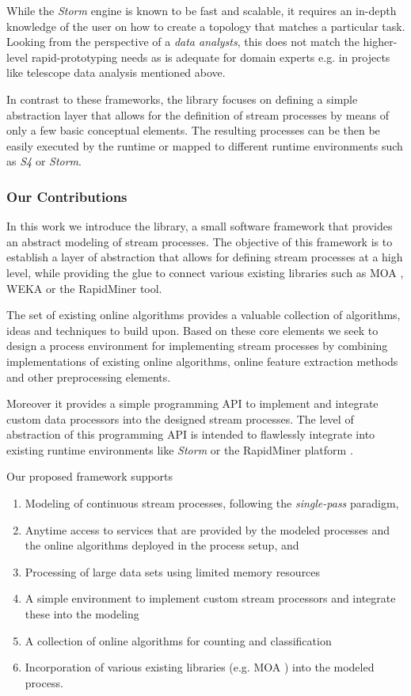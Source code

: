 While the {\em Storm} engine is known to be fast and scalable, it
requires an in-depth knowledge of the user on how to create a topology
that matches a particular task. Looking from the perspective of a {\em
  data analysts}, this does not match the higher-level
rapid-prototyping needs as is adequate for domain experts e.g. in
projects like telescope data analysis mentioned above.



In contrast to these frameworks, the \streams library focuses on
defining a simple abstraction layer that allows for the definition of
stream processes by means of only a few basic conceptual elements.
The resulting processes can be then be easily executed by the \streams
runtime or mapped to different runtime environments such as {\em S4}
or {\em Storm}.

\subsubsection*{Our Contributions}
In this work we introduce the \streams library, a small software
framework that provides an abstract modeling of stream processes. The
objective of this framework is to establish a layer of abstraction
that allows for defining stream processes at a high level, while
providing the glue to connect various existing libraries such as MOA
\cite{moa}, WEKA \cite{weka} or the RapidMiner tool.

The set of existing online algorithms provides a valuable collection
of algorithms, ideas and techniques to build upon. Based on these core
elements we seek to design a process environment for implementing
stream processes by combining implementations of existing online
algorithms, online feature extraction methods and other preprocessing
elements.

Moreover it provides a simple programming API to implement and
integrate custom data processors into the designed stream processes.
The level of abstraction of this programming API is intended to
flawlessly integrate into existing runtime environments like {\em
  Storm} or the RapidMiner platform \cite{rapidminerStreams}.

Our proposed framework supports
\begin{enumerate}
\item Modeling of continuous stream processes, following the {\em
    single-pass} paradigm,
\item Anytime access to services that are provided by the modeled
  processes and the online algorithms deployed in the process setup,
  and
\item Processing of large data sets using limited memory resources
\item A simple environment to implement custom stream processors and
  integrate these into the modeling
\item A collection of online algorithms for counting and classification
\item Incorporation of various existing libraries (e.g. MOA
  \cite{moa}) into the modeled process.
\end{enumerate}

